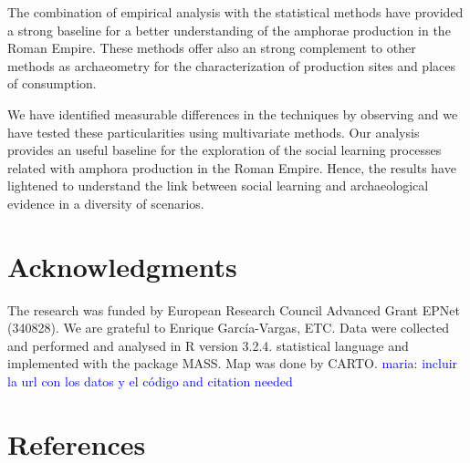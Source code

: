 \documentclass[review]{elsarticle}
\newcommand{\memo}[2]{\textcolor{#1}{#2}}
\newcommand{\maria}[1]{\memo{blue}{maria: #1\\}}
\begin{document}
The combination of empirical analysis with the statistical methods have provided a strong baseline for a better understanding of the amphorae production in the Roman Empire. These methods offer also an strong complement to other methods as archaeometry for the characterization of production sites and places of consumption.  

We have identified measurable differences in the techniques by observing and we have tested these particularities using multivariate methods. Our analysis provides an useful baseline for the exploration of the social learning processes related with amphora production in the Roman Empire. Hence, the results have lightened to understand the link between social learning and archaeological evidence in a diversity of scenarios. 

\section{Acknowledgments}

The research was funded by European Research Council Advanced Grant EPNet (340828).
We are grateful to Enrique Garc\'ia-Vargas, ETC.  Data were collected and performed and analysed in R version 3.2.4. statistical language and implemented with the package MASS. Map was done by CARTO. 
\maria{incluir la url con los datos y el código and citation needed}





\section*{References}

%

\end{document}
